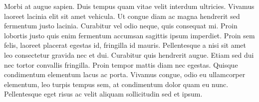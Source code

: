 Morbi at augue sapien. Duis tempus quam vitae velit interdum ultricies. Vivamus laoreet lacinia elit sit amet vehicula. Ut congue diam ac magna hendrerit sed fermentum justo lacinia. Curabitur vel odio neque, quis consequat mi. Proin lobortis justo quis enim fermentum accumsan sagittis ipsum imperdiet. Proin sem felis, laoreet placerat egestas id, fringilla id mauris. Pellentesque a nisi sit amet leo consectetur gravida nec et dui. Curabitur quis hendrerit augue. Etiam sed dui nec tortor convallis fringilla. Proin tempor mattis diam nec egestas. Quisque condimentum elementum lacus ac porta. Vivamus congue, odio eu ullamcorper elementum, leo turpis tempus sem, at condimentum dolor quam eu nunc. Pellentesque eget risus ac velit aliquam sollicitudin sed et ipsum. 




